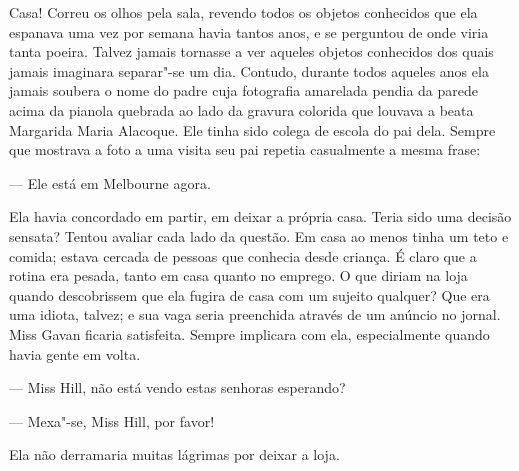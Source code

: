 Casa!  Correu os olhos pela sala, revendo todos os objetos conhecidos que ela
espanava uma vez por semana havia tantos anos, e se perguntou de onde viria
tanta poeira.  Talvez jamais tornasse a ver aqueles objetos conhecidos dos
quais jamais imaginara separar"-se um dia.  Contudo, durante todos aqueles anos
ela jamais soubera o nome do padre cuja fotografia amarelada pendia da parede
acima da pianola quebrada ao lado da gravura colorida que louvava a beata
Margarida Maria Alacoque.  Ele tinha sido colega de escola do pai dela.  Sempre
que mostrava a foto a uma visita seu pai repetia casualmente a mesma frase:

--- Ele está em Melbourne agora.

Ela havia concordado em partir, em deixar a própria casa.  Teria sido uma
decisão sensata?  Tentou avaliar cada lado da questão.  Em casa ao menos tinha
um teto e comida; estava cercada de pessoas que conhecia desde criança.  É
claro que a rotina era pesada, tanto em casa quanto no emprego.  O que diriam
na loja quando descobrissem que ela fugira de casa com um sujeito qualquer?
Que era uma idiota, talvez; e sua vaga seria preenchida através de um anúncio
no jornal.  Miss Gavan ficaria satisfeita.  Sempre implicara com ela,
especialmente quando havia gente em volta.

--- Miss Hill, não está vendo estas senhoras esperando?

--- Mexa"-se, Miss Hill, por favor!

Ela não derramaria muitas lágrimas por deixar a loja.

